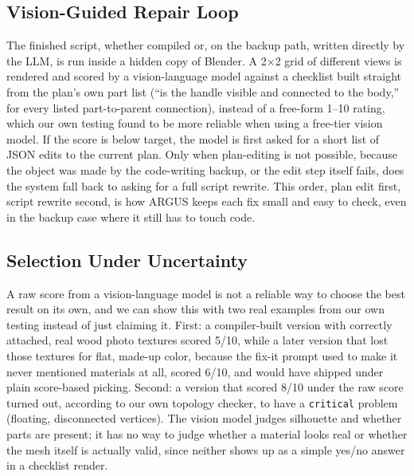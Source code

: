 \documentclass[conference]{IEEEtran}
\begin{document}
\subsection{Vision-Guided Repair Loop}
The finished script, whether compiled or, on the backup path, written directly by the LLM, is run inside a hidden copy of Blender. A 2$\times$2 grid of different views is rendered and scored by a vision-language model against a checklist built straight from the plan's own part list (``is the handle visible and connected to the body,'' for every listed part-to-parent connection), instead of a free-form 1--10 rating, which our own testing found to be more reliable when using a free-tier vision model. If the score is below target, the model is first asked for a short list of JSON edits to the current plan. Only when plan-editing is not possible, because the object was made by the code-writing backup, or the edit step itself fails, does the system fall back to asking for a full script rewrite. This order, plan edit first, script rewrite second, is how ARGUS keeps each fix small and easy to check, even in the backup case where it still has to touch code.

\subsection{Selection Under Uncertainty}
\label{sec:selection}
A raw score from a vision-language model is not a reliable way to choose the best result on its own, and we can show this with two real examples from our own testing instead of just claiming it. First: a compiler-built version with correctly attached, real wood photo textures scored 5/10, while a later version that lost those textures for flat, made-up color, because the fix-it prompt used to make it never mentioned materials at all, scored 6/10, and would have shipped under plain score-based picking. Second: a version that scored 8/10 under the raw score turned out, according to our own topology checker, to have a \texttt{critical} problem (floating, disconnected vertices). The vision model judges silhouette and whether parts are present; it has no way to judge whether a material looks real or whether the mesh itself is actually valid, since neither shows up as a simple yes/no answer in a checklist render.
\end{document}
